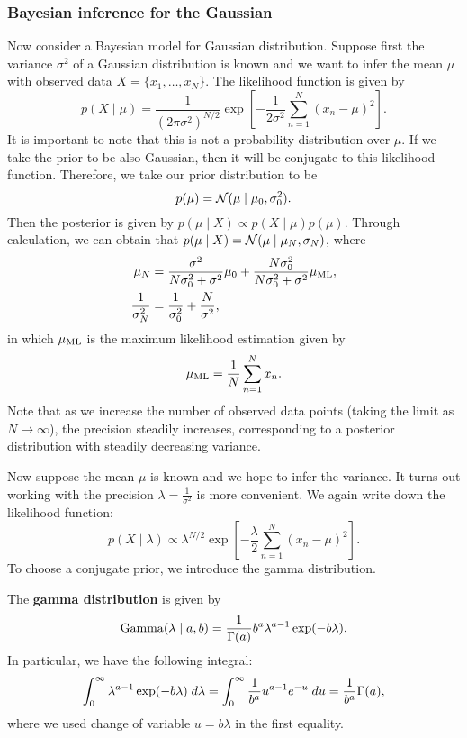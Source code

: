 \documentclass[a4paper]{article}
\begin{document}
\subsubsection{Bayesian inference for the Gaussian}

Now consider a Bayesian model for Gaussian distribution.
Suppose first the variance $\sigma^2$ of a Gaussian
distribution is known and we 
want to infer the mean $\mu$ with observed data 
$X = \{x_1, \dots, x_N\}$. The likelihood function is 
given by 
\[
p(X \mid \mu) = \frac{1}{(2 \pi \sigma^2)^{N / 2}}
\exp \left[ - \frac{1}{2 \sigma^2} 
\sum_{n=1}^N (x_n - \mu)^2 \right].
\]
It is important to note that this is not a probability
distribution over $\mu$.
If we take the prior to be also Gaussian, then it will be 
conjugate to this likelihood function. Therefore, 
we take our prior distribution to be 
\[
p(\mu) = \mathcal{N}(\mu \mid \mu_0, \sigma_0^2).
\]
Then the posterior is given by $p(\mu \mid X) 
\propto p(X \mid \mu) p(\mu)$. Through calculation, 
we can obtain that $p(\mu \mid X) = \mathcal{N}(\mu \mid
\mu_N, \sigma_N)$, where 
\[
\begin{aligned}
  \mu_N &= \frac{\sigma^2}{N \sigma_0^2 + \sigma^2} 
  \mu_0 + \frac{N \sigma_0^2}{N \sigma_0^2 + \sigma^2} 
  \mu_{\text{ML}}, \\
  \frac{1}{\sigma_N^2} &= \frac{1}{\sigma_0^2} 
  + \frac{N}{\sigma^2},
\end{aligned}
\]
in which $\mu_{\text{ML}}$ is the maximum likelihood estimation 
given by 
\[
\mu_{\text{ML}} = \frac{1}{N} \sum_{n=1}^N x_n.
\]
Note that as we increase the number of observed data points (taking the 
limit as $N \to \infty$), the precision steadily increases, 
corresponding to a posterior distribution with steadily 
decreasing variance.

Now suppose the mean $\mu$ is known and we hope to infer 
the variance. It turns out working with the precision 
$\lambda = \frac{1}{\sigma^2}$ is more convenient. We 
again write down the likelihood function: 
\[
p(X \mid \lambda) 
\propto \lambda^{N / 2} 
\exp \left[ - \frac{\lambda}{2} \sum_{n=1}^N 
(x_n - \mu)^2 \right].
\]
To choose a conjugate prior, we introduce the 
gamma distribution.

\begin{defi}
The \textbf{gamma distribution} is given by 
\[
\operatorname{Gamma}(\lambda \mid a, b) = 
\frac{1}{\Gamma(a)} b^a \lambda^{a - 1} \exp (-b \lambda).
\]  
In particular, we have the following integral: 
\[
\begin{aligned}
\int_0^\infty \lambda^{a - 1} \exp(- b \lambda) \; d \lambda
= \int_0^\infty \frac{1}{b^a} u^{a - 1} e^{-u} \; d u 
= \frac{1}{b^a} \Gamma(a),
\end{aligned}
\]
where we used change of variable $u = b \lambda$
in the first equality.
\end{defi}
\end{document}
